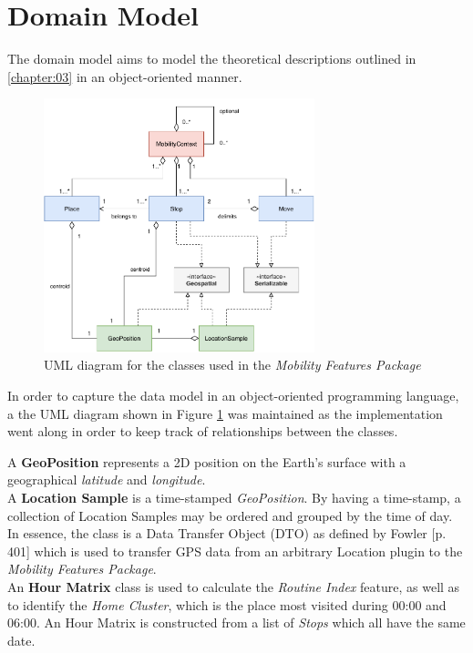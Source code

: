 \clearpage
\section{Domain Model}
The domain model aims to model the theoretical descriptions outlined in \ref{chapter:03} in an object-oriented manner.

\begin{figure}[h]
    \centering
    \includegraphics[width=0.7\textwidth]{images/diagrams/data-model-diagram.pdf}
    \caption{UML diagram for the classes used in the \textit{Mobility Features Package}}
    \label{fig:uml-diagram}
\end{figure}

In order to capture the data model in an object-oriented programming language, a the UML diagram shown in Figure \ref{fig:uml-diagram} was maintained as the implementation went along in order to keep track of relationships between the classes. 

A \textbf{GeoPosition} represents a 2D position on the Earth's surface with a geographical \textit{latitude} and \textit{longitude}.\\

A \textbf{Location Sample} is a time-stamped \textit{GeoPosition}. By having a time-stamp, a collection of Location Samples may be ordered and grouped by the time of day. In essence, the class is a Data Transfer Object (DTO) as defined by Fowler \cite{fowler-PEEA} [p. 401] which is used to transfer GPS data from an arbitrary Location plugin to the \textit{Mobility Features Package}.\\

An \textbf{Hour Matrix} class is used to calculate the \textit{Routine Index} feature, as well as to identify the \textit{Home Cluster}, which is the place most visited during 00:00 and 06:00. An Hour Matrix is constructed from a list of \textit{Stops} which all have the same date.\\

